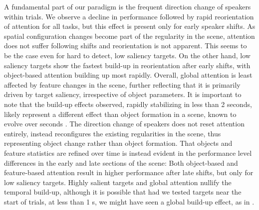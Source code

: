 \documentclass[9pt,twocolumn,twoside]{pnas-new}
\begin{document}
A fundamental part of our paradigm is the frequent direction change of speakers within trials. We observe a decline in performance followed by rapid reorientation of attention for all tasks, but this effect is present only for early speaker shifts. As spatial configuration changes become part of the regularity in the scene, attention does not suffer following shifts and reorientation is not apparent. This seems to be the case even for hard to detect, low saliency targets. On the other hand, low saliency targets show the fastest build-up in reorientation after early shifts, with object-based attention building up most rapidly. Overall, global attention is least affected by feature changes in the scene, further reflecting that it is primarily driven by target saliency, irrespective of object parameters. It is important to note that the build-up effects observed, rapidly stabilizing in less than 2 seconds, likely represent a different effect than object formation in a scene, known to evolve over seconds \cite{Cusack04a,Kaya14a,shinn2017auditory}. The direction change of speakers does not reset attention entirely, instead reconfigures the existing regularities in the scene, thus representing object change rather than object formation. That objects and feature statistics are refined over time is instead evident in the performance level differences in the early and late sections of the scene: Both object-based and feature-based attention result in higher performance after late shifts, but only for low saliency targets. Highly salient targets and global attention nullify the temporal build-up, although it is possible that had we tested targets near the start of trials, at less than 1 s, we might have seen a global build-up effect, as in \cite{Kaya14a}.
\end{document}
